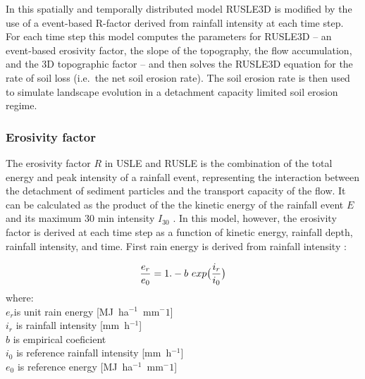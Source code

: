 \documentclass[gmd, manuscript]{copernicus}
\begin{document}
In this spatially and temporally distributed model 
RUSLE3D is modified by the use of a 
event-based R-factor derived from rainfall intensity at each time step.
For each time step this model computes the parameters for RUSLE3D -- 
an event-based erosivity factor,
the slope of the topography, the flow accumulation, and
the 3D topographic factor -- 
and then solves the RUSLE3D equation for the rate of soil loss 
(i.e.~the net soil erosion rate). 
The soil erosion rate is then used to simulate landscape evolution 
in a detachment capacity limited soil erosion regime.


\subsubsection{Erosivity factor}

The erosivity factor $R$ in USLE and RUSLE 
is the combination of the total energy 
and peak intensity of a rainfall event,
representing the interaction 
between the detachment of sediment particles
and the transport capacity of the flow. 
It can be calculated as the product of the 
the kinetic energy of the rainfall event $E$
and its maximum 30 \unit{min} intensity $I_{30}$
\citep{Brown1987,Renard1997,Panagos2015,Panagos2017}.
In this model, however, the erosivity factor
is derived at each time step as a function of
kinetic energy, rainfall depth, rainfall intensity, and time.
First rain energy is derived from rainfall intensity \citep{Brown1987,Yin2017}:

\begin{equation}
\label{eq:rain_energy}
{e_r \over e_0} = 1.- b ~ exp\bigl({i_r \over i_0} \bigr)
\end{equation}
%
{\small
\noindent
where: \\
\noindent
\hspace*{0.5em} $e_r$is unit rain energy [\unit{MJ~ha}$^{-1}$~\unit{mm}${^-1}$]\\
\hspace*{0.5em} $i_r$ is rainfall intensity [\unit{mm~h}$^{-1}$]\\
\hspace*{0.5em} $b$ is empirical coeficient\\
\hspace*{0.5em} $i_0$ is reference rainfall intensity [\unit{mm~h}$^{-1}$]\\
\hspace*{0.5em} $e_0$ is reference energy [\unit{MJ~ha}$^{-1}$~\unit{mm}${^-1}$] 
}
\end{document}
